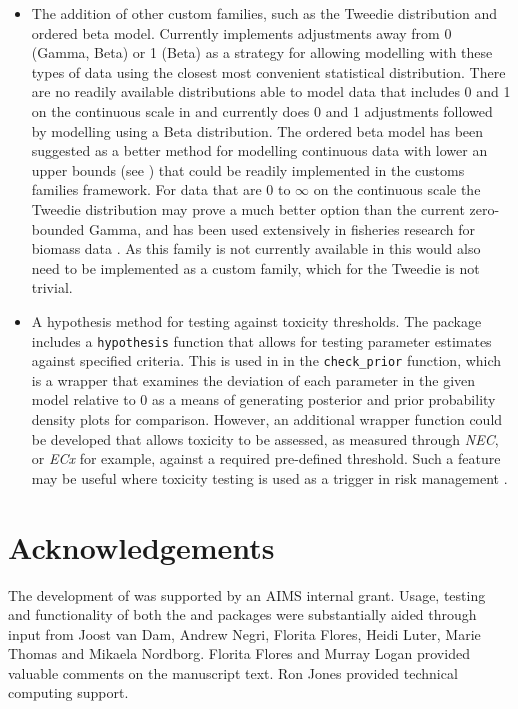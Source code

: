 \documentclass[
]{jss}
\begin{document}
\begin{itemize}
\item
  The addition of other custom families, such as the Tweedie
  distribution and ordered beta model. Currently 
  implements adjustments away from 0 (Gamma, Beta) or 1 (Beta) as a
  strategy for allowing modelling with these types of data using the
  closest most convenient statistical distribution. There are no readily
  available distributions able to model data that includes 0 and 1 on
  the continuous scale in  and  currently does 0
  and 1 adjustments followed by modelling using a Beta distribution. The
  ordered beta model has been suggested as a better method for modelling
  continuous data with lower an upper bounds (see \citep{Kubinec}) that
  could be readily implemented in the  customs families
  framework. For data that are 0 to \(\infty\) on the continuous scale
  the Tweedie distribution may prove a much better option than the
  current zero-bounded Gamma, and has been used extensively in fisheries
  research for biomass data \citep{Shono2008}. As this family is not
  currently available in  this would also need to be
  implemented as a custom family, which for the Tweedie is not trivial.
\item
  A hypothesis method for testing against toxicity thresholds. The
   package includes a \texttt{hypothesis} function that allows
  for testing parameter estimates against specified criteria. This is
  used in  in the \texttt{check\_prior} function, which is
  a wrapper that examines the deviation of each parameter in the given
  model relative to 0 as a means of generating posterior and prior
  probability density plots for comparison. However, an additional
  wrapper function could be developed that allows toxicity to be
  assessed, as measured through \emph{NEC}, or \emph{ECx} for example,
  against a required pre-defined threshold. Such a feature may be useful
  where toxicity testing is used as a trigger in risk management
  \citep[for example, using whole-effluent-toxicity (WET)
  testing,][]{Karman2019}.
\end{itemize}

\hypertarget{acknowledgements}{%
\section{Acknowledgements}\label{acknowledgements}}

The development of  was supported by an AIMS internal
grant. Usage, testing and functionality of both the  and
 packages were substantially aided through input from
Joost van Dam, Andrew Negri, Florita Flores, Heidi Luter, Marie Thomas
and Mikaela Nordborg. Florita Flores and Murray Logan provided valuable
comments on the manuscript text. Ron Jones provided technical computing
support.

\renewcommand\refname{References}

\end{document}
